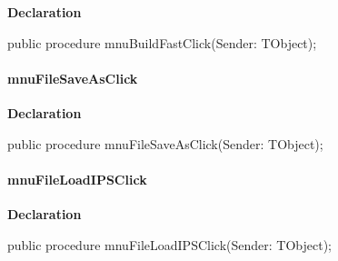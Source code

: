 \documentclass{report}
\newif\ifpdf
\begin{document}
\label{editor.TfrmEditor-mnuBuildFastClick}
\begin{list}{}{
\setlength{\itemindent}{0cm}
\setlength{\listparindent}{0cm}
\setlength{\leftmargin}{\evensidemargin}
\addtolength{\leftmargin}{\tmplength}
\settowidth{\labelsep}{X}
\addtolength{\leftmargin}{\labelsep}
\setlength{\labelwidth}{\tmplength}
}
\item[\textbf{Declaration}\hfill]
\ifpdf
\begin{flushleft}
\fi
\begin{ttfamily}
public procedure mnuBuildFastClick(Sender: TObject);\end{ttfamily}

\ifpdf
\end{flushleft}
\fi

\end{list}
\paragraph*{mnuFileSaveAsClick}\hspace*{\fill}

\label{editor.TfrmEditor-mnuFileSaveAsClick}
\begin{list}{}{
\setlength{\itemindent}{0cm}
\setlength{\listparindent}{0cm}
\setlength{\leftmargin}{\evensidemargin}
\addtolength{\leftmargin}{\tmplength}
\settowidth{\labelsep}{X}
\addtolength{\leftmargin}{\labelsep}
\setlength{\labelwidth}{\tmplength}
}
\item[\textbf{Declaration}\hfill]
\ifpdf
\begin{flushleft}
\fi
\begin{ttfamily}
public procedure mnuFileSaveAsClick(Sender: TObject);\end{ttfamily}

\ifpdf
\end{flushleft}
\fi

\end{list}
\paragraph*{mnuFileLoadIPSClick}\hspace*{\fill}

\label{editor.TfrmEditor-mnuFileLoadIPSClick}
\begin{list}{}{
\setlength{\itemindent}{0cm}
\setlength{\listparindent}{0cm}
\setlength{\leftmargin}{\evensidemargin}
\addtolength{\leftmargin}{\tmplength}
\settowidth{\labelsep}{X}
\addtolength{\leftmargin}{\labelsep}
\setlength{\labelwidth}{\tmplength}
}
\item[\textbf{Declaration}\hfill]
\ifpdf
\begin{flushleft}
\fi
\begin{ttfamily}
public procedure mnuFileLoadIPSClick(Sender: TObject);\end{ttfamily}

\ifpdf
\end{flushleft}
\fi

\end{list}
\end{document}
